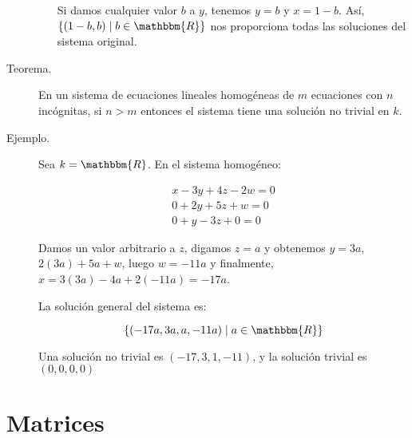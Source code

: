 \documentclass[12pt]{article}
\begin{document}
\begin{description}
\begin{enumerate}
Si damos cualquier valor $b$ a $y$, tenemos $y = b$ y $x = 1 - b$. Así, $\left\{ (1 - b, b) \mid b \in \mathbbm{R} \right\}$ nos proporciona todas las soluciones del sistema original.
\end{enumerate}

\item [Teorema.] En un sistema de ecuaciones lineales homogéneas de $m$ ecuaciones con $n$ incógnitas, si $n > m$ entonces el sistema tiene una solución no trivial en $k$.

\item [Ejemplo.] Sea $k = \mathbbm{R}$. En el sistema homogéneo:

\begin{eqnarray}
x - 3 y + 4 z - 2 w = 0 \nonumber \\
0 + 2 y + 5 z +   w = 0 \nonumber \\
0 +   y - 3 z +   0 = 0 \nonumber
\end{eqnarray}

Damos un valor arbitrario a $z$, digamos $z = a$ y obtenemos $y = 3 a $, $2 (3 a) + 5 a + w$, luego $w = -11 a$ y finalmente, $x = 3 (3 a) - 4 a + 2 (-11 a) = -17 a$.

La solución general del sistema es:

\begin{equation}
\left\{ (-17 a, 3 a, a, -11 a) \mid a \in \mathbbm{R} \right\} \nonumber
\end{equation}

Una solución no trivial es $(-17, 3, 1, -11)$, y la solución trivial es $(0, 0, 0, 0)$
\end{description}

\newpage
\section{Matrices}
\end{document}
